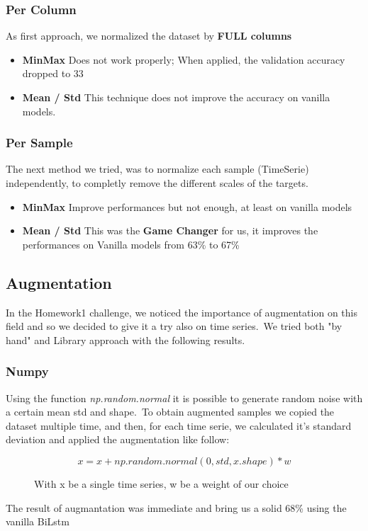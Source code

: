 \documentclass[11pt]{article}
\begin{document}
\subsubsection{Per Column}
As first approach, we normalized the dataset by \textbf{FULL columns}
\begin{itemize}
  \item \textbf{MinMax} Does not work properly; When applied, the validation accuracy dropped to 33%
  \item \textbf{Mean / Std} This technique does not improve the accuracy on vanilla models.
\end{itemize}
\subsubsection{Per Sample}
The next method we tried, was to normalize each sample (TimeSerie) independently, to completly remove the different scales of the targets.
\begin{itemize}
  \item \textbf{MinMax} Improve performances but not enough, at least on vanilla models
  \item \textbf{Mean / Std} This was the \textbf{Game Changer} for us, it improves the performances on Vanilla models from 63\% to 67\%
\end{itemize}
\subsection{Augmentation}
In the Homework1 challenge, we noticed the importance of augmentation on this field and so we decided to give it a try also on time series.\
We tried both "by hand" and Library approach with the following results.
\subsubsection{Numpy}
Using the function \textit{np.random.normal} it is possible to generate random noise with a certain mean std and shape.\
To obtain augmented samples we copied the dataset multiple time, and then, for each time serie, we calculated it's standard deviation and applied the augmentation like follow:

\begin{figure}[h]
  \[ x = x + np.random.normal(0,std,x.shape) * w\]
  \caption{With x be a single time series, w be a weight of our choice}
\end{figure}

The result of augmantation was immediate and bring us a solid 68\% using the vanilla BiLstm
\end{document}
